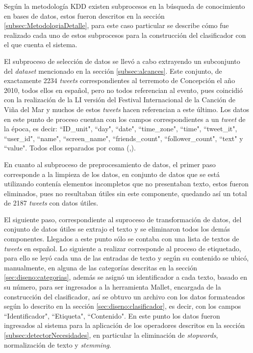 Según la metodología KDD existen subprocesos en la búsqueda de conocimiento en bases de datos, estos fueron descritos en la sección \ref{subsec:MetodologiaDetalle}, para este caso particular se describe cómo fue realizado cada uno de estos subprocesos para la construcción del clasificador con el que cuenta el sistema.

El subproceso de selección de datos se llevó a cabo extrayendo un subconjunto del \textit{dataset} mencionado en la sección \ref{subsec:alcances}. Este conjunto, de exactamente 2234 \textit{tweets} correspondientes al terremoto de Concepción el año 2010, todos ellos en español, pero no todos referencian al evento, pues coincidió con la realización de la LI versión del Festival Internacional de la Canción de Viña del Mar y muchos de estos \textit{tweets} hacen referencian a este último. Los datos en este punto de proceso cuentan con los campos correspondientes a un \textit{tweet} de la época, es decir: ``ID\_unit", ``day", ``date", ``time\_zone", ``time", ``tweet\_it", ``user\_id", ``name", ``screen\_name", ``friends\_count", ``follower\_count", ``text" y ``value". Todos ellos separados por coma (,).

En cuanto al subproceso de preprocesamiento de datos, el primer paso corresponde a la limpieza de los datos, en conjunto de datos que se está utilizando contenía elementos incompletos que no presentaban texto, estos fueron eliminados, pues no resultaban útiles sin este componente, quedando así un total de 2187 \textit{tweets} con datos útiles.

El siguiente paso, correspondiente al suproceso de transformación de datos, del conjunto de datos útiles se extrajo el texto y se eliminaron todos los demás componentes. Llegados a este punto sólo se contaba con una lista de textos de \textit{tweets} en español. Lo siguiente a realizar corresponde al proceso de etiquetado, para ello se leyó cada una de las entradas de texto y según su contenido se ubicó, manualmente, en alguna de las categorías descritas en la sección \ref{sec:diseno:categorias}, además se asignó un identificador a cada texto, basado en su número, para ser ingresados a la herramienta Mallet, encargada de la construcción del clasificador, así se obtuvo un archivo con los datos formateados según lo descrito en la sección \ref{sec:diseno:clasificador}, es decir, con los campos ``Identificador", ``Etiqueta", ``Contenido". En este punto los datos fueron ingresados al sistema para la aplicación de los operadores descritos en la sección \ref{subsec:detectorNecesidades}, en particular la eliminación de \textit{stopwords}, normalización de texto y \textit{stemming}.

